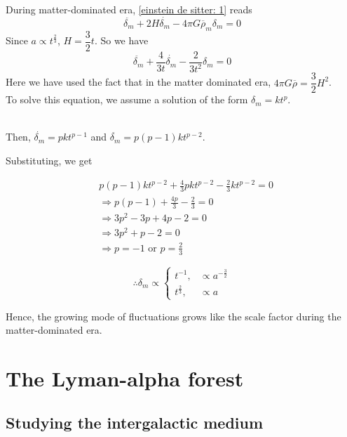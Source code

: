 \documentclass[a4,12pt,oneside]{report}
\begin{document}
	During matter-dominated era, \eqref{einstein de sitter: 1} reads
	\begin{equation}\label{key}
	\ddot{\delta_m} + 2H\dot{\delta_m} - 4\pi G\overline{\rho}_m\delta_m = 0
	\end{equation}
	Since $ a\propto t^{\frac{2}{3}} $, $ H=\dfrac{3}{2}t $. So we have
	\begin{equation}\label{key}
	\ddot{\delta_m} + \frac{4}{3t}\dot{\delta_m} - \frac{2}{3t^2}\delta_m = 0
	\end{equation}
	Here we have used the fact that in the matter dominated era, $ 4\pi G \overline{\rho} = \dfrac{3}{2}H^2 $.
	\\
	To solve this equation, we assume a solution of the form $ \delta_m = kt^p $. \\ \\
	\begin{center}
		Then, $ \dot{\delta_m} = pkt^{p-1} $ and $ \ddot{\delta_m} = p(p-1)kt^{p-2}$.
	\end{center}
	
	Substituting, we get
	
	\begin{align}\label{key}
	&p(p-1)kt^{p-2} + \frac{4}{3}pkt^{p-2} - \frac{2}{3}kt^{p-2} = 0 \nonumber
	\\
	&\Rightarrow p(p-1)+\frac{4p}{3} - \frac{2}{3} = 0 \nonumber
	\\
	&\Rightarrow 3p^2 - 3p + 4p -2 =0 \nonumber
	\\
	&\Rightarrow 3p^2+p-2 = 0 \nonumber
	\\
	&\Rightarrow p=-1 \text{ or } p=\frac{2}{3} \nonumber
	\end{align}
	
	\begin{equation}\label{key}
	\therefore \delta_m \propto \begin{cases}t^{-1}, &\propto a^{-\frac{3}{2}}\\
	t^{\frac{2}{3}}, &\propto a
	\end{cases}
	\end{equation}
	
	Hence, the growing mode of fluctuations grows like the scale factor during the matter-dominated era.
	
	
	
	\chapter{The Lyman-alpha forest}
	
	\section{Studying the intergalactic medium}
 
\end{document}
